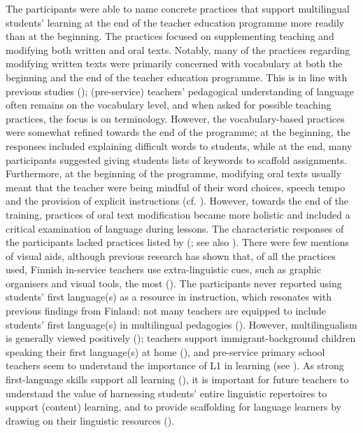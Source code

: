 \documentclass[output=paper]{langscibook}
\begin{document}
The participants were able to name concrete practices that support multilingual students’ learning at the end of the teacher education programme more readily than at the beginning. The practices focused on supplementing teaching and modifying both written and oral texts. Notably, many of the practices regarding modifying written texts were primarily concerned with vocabulary at both the beginning and the end of the teacher education programme. This is in line with previous studies (\citealt{Aalto2019,HeikkolaEtAl2021,Heikkola2022-1}); (pre-service) teachers’ pedagogical understanding of language often remains on the vocabulary level, and when asked for possible teaching practices, the focus is on terminology. However, the vocabulary-based practices were somewhat refined towards the end of the programme; at the beginning, the responses included explaining difficult words to students, while at the end, many participants suggested giving students lists of keywords to scaffold assignments. Furthermore, at the beginning of the programme, modifying oral texts usually meant that the teacher were being mindful of their word choices, speech tempo and the provision of explicit instructions (cf. \citealt{HiteEvans2006}). However, towards the end of the training, practices of oral text modification became more holistic and included a critical examination of language during lessons. The characteristic responses of the participants lacked practices listed by \citeauthor{LucasEtAl2008} (\citeyear{LucasEtAl2008}; see also ). There were few mentions of visual aids, although previous research has shown that, of all the practices used, Finnish in-service teachers use extra-linguistic cues, such as graphic organisers and visual tools, the most (\citealt{HeikkolaEtAl2022}). The participants never reported using students’ first language(s) as a resource in instruction, which resonates with previous findings from Finland: not many teachers are equipped to include students’ first language(s) in multilingual pedagogies (\citealt{AlisaariEtAl2019}). However, multilingualism is generally viewed positively (\citealt{AlisaariEtAl2019}); teachers support immigrant-background children speaking their first language(s) at home (\citealt{AlisaariEtAl2021}), and pre-service primary school teachers seem to understand the importance of L1 in learning (see \citealt{chapters/7_alisaari}). As strong first-language skills support all learning (\citealt{Gibbons2014,LucasVillegas2010}), it is important for future teachers to understand the value of harnessing students’ entire linguistic repertoires to support (content) learning, and to provide scaffolding for language learners by drawing on their linguistic resources (\citealt{Cummins2021,Garcia2009-2}).
\end{document}
